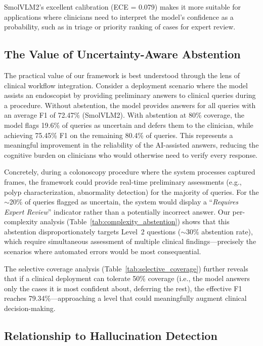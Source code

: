 \documentclass[pdflatex,sn-mathphys-num]{sn-jnl}
\begin{document}
SmolVLM2's excellent calibration (ECE = 0.079) makes it more suitable for applications where clinicians need to interpret the model's confidence as a probability, such as in triage or priority ranking of cases for expert review.

\subsection{The Value of Uncertainty-Aware Abstention}

The practical value of our framework is best understood through the lens of clinical workflow integration. Consider a deployment scenario where the model assists an endoscopist by providing preliminary answers to clinical queries during a procedure. Without abstention, the model provides answers for all queries with an average F1 of 72.47\% (SmolVLM2). With abstention at 80\% coverage, the model flags 19.6\% of queries as uncertain and defers them to the clinician, while achieving 75.45\% F1 on the remaining 80.4\% of queries. This represents a meaningful improvement in the reliability of the AI-assisted answers, reducing the cognitive burden on clinicians who would otherwise need to verify every response.

Concretely, during a colonoscopy procedure where the system processes captured frames, the framework could provide real-time preliminary assessments (e.g., polyp characterization, abnormality detection) for the majority of queries. For the $\sim$20\% of queries flagged as uncertain, the system would display a ``\textit{Requires Expert Review}'' indicator rather than a potentially incorrect answer. Our per-complexity analysis (Table~\ref{tab:complexity_abstention}) shows that this abstention disproportionately targets Level~2 questions ($\sim$30\% abstention rate), which require simultaneous assessment of multiple clinical findings---precisely the scenarios where automated errors would be most consequential.

The selective coverage analysis (Table~\ref{tab:selective_coverage}) further reveals that if a clinical deployment can tolerate 50\% coverage (i.e., the model answers only the cases it is most confident about, deferring the rest), the effective F1 reaches 79.34\%---approaching a level that could meaningfully augment clinical decision-making.

\subsection{Relationship to Hallucination Detection}
\end{document}
